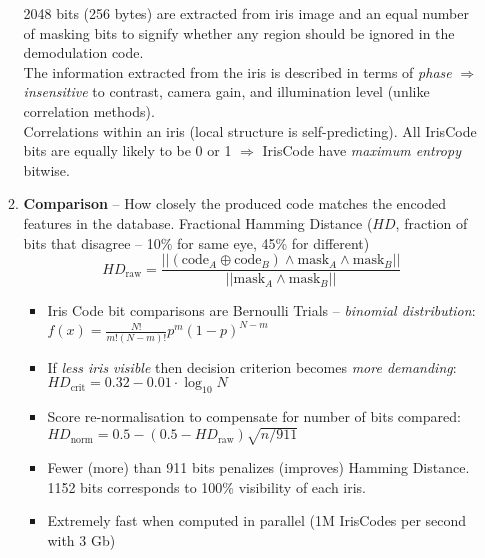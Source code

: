 \documentclass[a4paper]{article}
\begin{document}
\begin{itemize}
\begin{enumerate}
          2048 bits (256 bytes) are extracted from iris image and an equal number of masking bits to signify whether any region should be ignored in the demodulation code.\\
          The information extracted from the iris is described in terms of \emph{phase} $\Rightarrow$ \emph{insensitive} to contrast, camera gain, and illumination level (unlike correlation methods).\\
          Correlations within an iris (local structure is self-predicting). All IrisCode bits are equally likely to be 0 or 1 $\Rightarrow$ IrisCode  have \emph{maximum entropy} bitwise.
          \item \textbf{Comparison} -- How closely the produced code matches the encoded features in the database. Fractional Hamming Distance ($HD$, fraction of bits that disagree -- 10\% for same eye, 45\% for different)
            $$HD_\text{raw}=\frac{||(\text{code}_A \oplus\text{code}_B)\land \text{mask}_A\land \text{mask}_B||}{||\text{mask}_A\land \text{mask}_B||}$$
          \begin{itemize}
            \item Iris Code bit comparisons are Bernoulli Trials -- \emph{binomial distribution}:\\$f(x)=\frac{N!}{m!(N-m)!}p^m(1-p)^{N-m}$\\
            \item If \emph{less iris visible} then decision criterion becomes \emph{more demanding}:\\ $HD_\text{crit}=0.32-0.01\cdot\log_{10}{N}$
            \item Score re-normalisation to compensate for number of bits compared:\\$HD_\text{norm}=0.5-(0.5-HD_\text{raw})\sqrt{n/911}$
            \item Fewer (more) than 911 bits penalizes (improves) Hamming Distance. 1152 bits corresponds to 100\% visibility of each iris.
            \item Extremely fast when computed in parallel (1M IrisCodes per second with 3 Gb)
          \end{itemize}
        \end{enumerate}
      \end{itemize}
\end{document}
